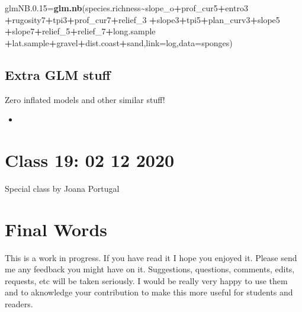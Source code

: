 \documentclass[
]{book}
\newenvironment{Shaded}{\begin{snugshade}}{\end{snugshade}}
\newcommand{\AttributeTok}[1]{\textcolor[rgb]{0.13,0.29,0.53}{#1}}
\newcommand{\FloatTok}[1]{\textcolor[rgb]{0.00,0.00,0.81}{#1}}
\newcommand{\FunctionTok}[1]{\textcolor[rgb]{0.13,0.29,0.53}{\textbf{#1}}}
\newcommand{\NormalTok}[1]{#1}
\newcommand{\OtherTok}[1]{\textcolor[rgb]{0.56,0.35,0.01}{#1}}
\newcommand{\SpecialCharTok}[1]{\textcolor[rgb]{0.81,0.36,0.00}{\textbf{#1}}}
\providecommand{\tightlist}{%
  \setlength{\itemsep}{0pt}\setlength{\parskip}{0pt}}
\begin{document}
\begin{Shaded}
\begin{Highlighting}[]
\NormalTok{glmNB.}\FloatTok{0.15}\OtherTok{=}\FunctionTok{glm.nb}\NormalTok{(species.richness}\SpecialCharTok{\textasciitilde{}}\NormalTok{slope\_o}\SpecialCharTok{+}\NormalTok{prof\_cur5}\SpecialCharTok{+}\NormalTok{entro3 }
\SpecialCharTok{+}\NormalTok{rugosity7}\SpecialCharTok{+}\NormalTok{tpi3}\SpecialCharTok{+}\NormalTok{prof\_cur7}\SpecialCharTok{+}\NormalTok{relief\_3 }
\SpecialCharTok{+}\NormalTok{slope3}\SpecialCharTok{+}\NormalTok{tpi5}\SpecialCharTok{+}\NormalTok{plan\_curv3}\SpecialCharTok{+}\NormalTok{slope5 }
\SpecialCharTok{+}\NormalTok{slope7}\SpecialCharTok{+}\NormalTok{relief\_5}\SpecialCharTok{+}\NormalTok{relief\_7}\SpecialCharTok{+}\NormalTok{long.sample }
\SpecialCharTok{+}\NormalTok{lat.sample}\SpecialCharTok{+}\NormalTok{gravel}\SpecialCharTok{+}\NormalTok{dist.coast}\SpecialCharTok{+}\NormalTok{sand,}\AttributeTok{link=}\NormalTok{log,}\AttributeTok{data=}\NormalTok{sponges)}
\end{Highlighting}
\end{Shaded}

\hypertarget{extra-glm-stuff}{%
\section{Extra GLM stuff}\label{extra-glm-stuff}}

Zero inflated models and other similar stuff!

\begin{itemize}
\tightlist
\item
  \citet{Martin2005}
\end{itemize}

\hypertarget{aula19}{%
\chapter{Class 19: 02 12 2020}\label{aula19}}

Special class by Joana Portugal

\hypertarget{final-words}{%
\chapter{Final Words}\label{final-words}}

This is a work in progress. If you have read it I hope you enjoyed it. Please send me any feedback you might have on it. Suggestions, questions, comments, edits, requests, etc will be taken seriously. I would be really very happy to use them and to aknowledge your contribution to make this more useful for students and readers.

  
\end{document}
